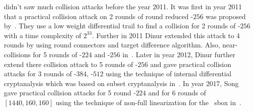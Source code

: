 \KECCAK{} didn't saw much collision attacks before the year 2011. It was first in year 2011 that a practical collision attack on 2 rounds of round reduced \KECCAK-$256$ was proposed by~\cite{naya2011practical}. They use a low weight differential trail to find a collision for 2 rounds of \KECCAK-$256$ with a time complexity of $2^{33}$. Further in 2011 Dinur \etal extended this attack to 4 rounds by using round connectors and target difference algorithm. Also, near-collisions for 5 rounds of \KECCAK-$224$ and \KECCAK-$256$ in~\cite{dinur2012new}. Later in year 2012, Dinur \etal further extend there collision attack to 5 rounds of \KECCAK-$256$ and gave practical collision attacks for 3 rounds of \KECCAK-$384$, \KECCAK-$512$ using the technique of internal differential cryptanalysis which was based on subset cryptanalysis in~\cite{dinur2013collision}. In year 2017, Song \etal gave practical collision attacks for 5 round \KECCAK-$224$ and for 6 rounds of \KECCAK$[1440, 160, 160]$ using the technique of non-full linearization for the \KECCAK\ sbox in~\cite{song2017non}.

